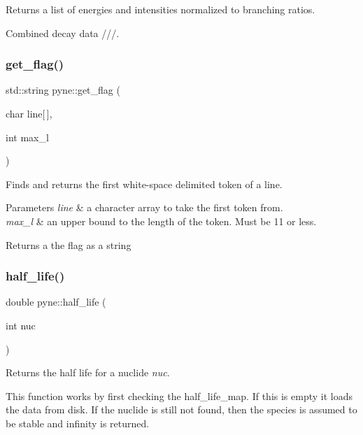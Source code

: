 Returns a list of energies and intensities normalized to branching ratios. 

Combined decay data ///. \mbox{\label{namespacepyne_ab883f7c602f63e87fae5c2f48cfed0f8}} 
\subsubsection{\texorpdfstring{get\+\_\+flag()}{get\_flag()}}
{\footnotesize\ttfamily std\+::string pyne\+::get\+\_\+flag (\begin{DoxyParamCaption}\item[{char}]{line\mbox{[}$\,$\mbox{]},  }\item[{int}]{max\+\_\+l }\end{DoxyParamCaption})}

Finds and returns the first white-\/space delimited token of a line. 
\begin{DoxyParams}{Parameters}
{\em line} & a character array to take the first token from. \\
\hline
{\em max\+\_\+l} & an upper bound to the length of the token. Must be 11 or less. \\
\hline
\end{DoxyParams}
\begin{DoxyReturn}{Returns}
a the flag as a string 
\end{DoxyReturn}
\mbox{\label{namespacepyne_a98f776164d1812878cb4b4ee4ef943f5}} 
\subsubsection{\texorpdfstring{half\+\_\+life()}{half\_life()}}
{\footnotesize\ttfamily double pyne\+::half\+\_\+life (\begin{DoxyParamCaption}\item[{int}]{nuc }\end{DoxyParamCaption})}



Returns the half life for a nuclide {\itshape nuc}. 

This function works by first checking the half\+\_\+life\+\_\+map. If this is empty it loads the data from disk. If the nuclide is still not found, then the species is assumed to be stable and infinity is returned. \mbox{\label{namespacepyne_a11f4852ba4824c0e047b509efe0c6b8c}} 
